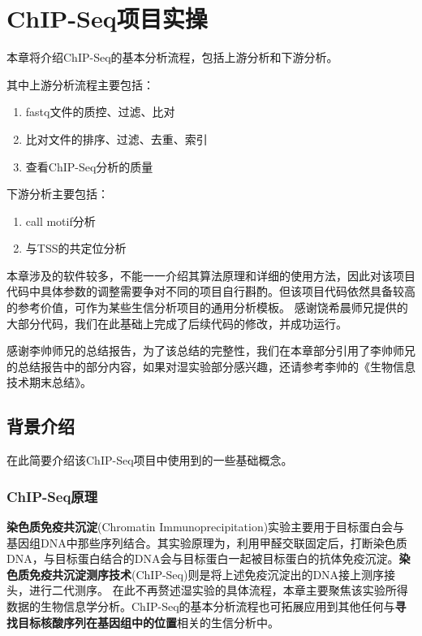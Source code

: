 \chapter{ChIP-Seq项目实操}

本章将介绍ChIP-Seq的基本分析流程，包括上游分析和下游分析。\par
其中上游分析流程主要包括：
\begin{enumerate}
    \item fastq文件的质控、过滤、比对
    \item 比对文件的排序、过滤、去重、索引
    \item 查看ChIP-Seq分析的质量
\end{enumerate}

下游分析主要包括：
\begin{enumerate}
    \item call motif分析
    \item 与TSS的共定位分析
\end{enumerate}

本章涉及的软件较多，不能一一介绍其算法原理和详细的使用方法，因此对该项目代码中具体参数的调整需要争对不同的项目自行斟酌。但该项目代码依然具备较高的参考价值，可作为某些生信分析项目的通用分析模板。
感谢饶希晨师兄提供的大部分代码，我们在此基础上完成了后续代码的修改，并成功运行。\par
感谢李帅师兄的总结报告，为了该总结的完整性，我们在本章部分引用了李帅师兄的总结报告中的部分内容，如果对湿实验部分感兴趣，还请参考李帅的《生物信息技术期末总结》。


\section{背景介绍}

在此简要介绍该ChIP-Seq项目中使用到的一些基础概念。

\subsection{ChIP-Seq原理}

\textbf{染色质免疫共沉淀}(Chromatin Immunoprecipitation)实验主要用于目标蛋白会与基因组DNA中那些序列结合。其实验原理为，利用甲醛交联固定后，打断染色质DNA，与目标蛋白结合的DNA会与目标蛋白一起被目标蛋白的抗体免疫沉淀。\textbf{染色质免疫共沉淀测序技术}(ChIP-Seq)则是将上述免疫沉淀出的DNA接上测序接头，进行二代测序。
在此不再赘述湿实验的具体流程，本章主要聚焦该实验所得数据的生物信息学分析。ChIP-Seq的基本分析流程也可拓展应用到其他任何与\textbf{寻找目标核酸序列在基因组中的位置}相关的生信分析中。


